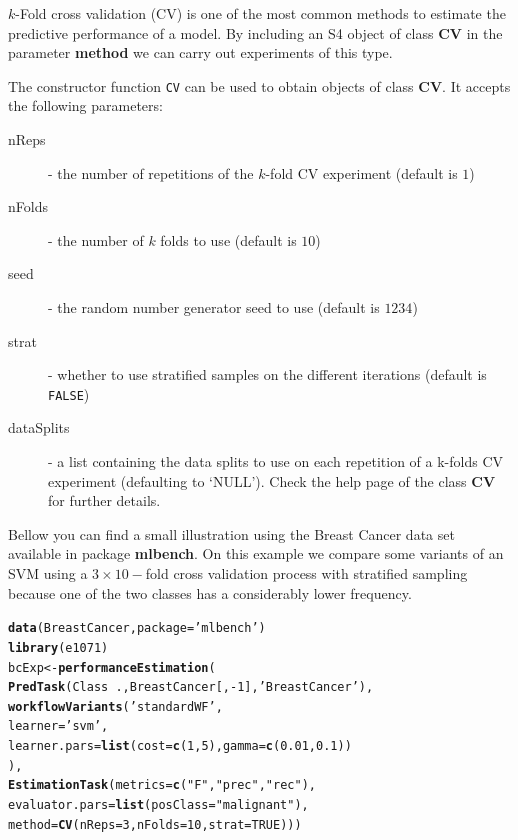 \documentclass[10pt,a4paper]{article}\usepackage[]{graphicx}\usepackage[]{color}
\makeatletter
\newcommand{\hlnum}[1]{\textcolor[rgb]{0.686,0.059,0.569}{#1}}%
\newcommand{\hlstr}[1]{\textcolor[rgb]{0.192,0.494,0.8}{#1}}%
\newcommand{\hlopt}[1]{\textcolor[rgb]{0,0,0}{#1}}%
\newcommand{\hlstd}[1]{\textcolor[rgb]{0.345,0.345,0.345}{#1}}%
\newcommand{\hlkwb}[1]{\textcolor[rgb]{0.69,0.353,0.396}{#1}}%
\newcommand{\hlkwc}[1]{\textcolor[rgb]{0.333,0.667,0.333}{#1}}%
\newcommand{\hlkwd}[1]{\textcolor[rgb]{0.737,0.353,0.396}{\textbf{#1}}}%
\newenvironment{kframe}{%
 \def\at@end@of@kframe{}%
 \ifinner\ifhmode%
  \def\at@end@of@kframe{\end{minipage}}%
  \begin{minipage}{\columnwidth}%
 \fi\fi%
 \def\FrameCommand##1{\hskip\@totalleftmargin \hskip-\fboxsep
 \colorbox{shadecolor}{##1}\hskip-\fboxsep
     \hskip-\linewidth \hskip-\@totalleftmargin \hskip\columnwidth}%
 \MakeFramed {\advance\hsize-\width
   \@totalleftmargin\z@ \linewidth\hsize
   \@setminipage}}%
 {\par\unskip\endMakeFramed%
 \at@end@of@kframe}
\newenvironment{knitrout}{}{} %
\makeatother
\begin{document}
$k$-Fold cross validation (CV) is one of the most common 
methods to estimate the predictive performance of a model. By
including an S4 object of class \textbf{CV} in the parameter \textbf{method} we can carry
out experiments of this type.

The constructor function \texttt{CV} can be used to obtain objects
of class \textbf{CV}. It accepts the following parameters:

\begin{description}
\item[nReps] - the number of repetitions of the $k$-fold CV experiment (default is $1$)
\item[nFolds] - the number of $k$ folds to use (default is $10$)
\item[seed] - the random number generator seed to use (default is $1234$)
\item[strat] - whether to use stratified samples on the different iterations (default is \texttt{FALSE})
\item[dataSplits] - a list containing the data splits to
          use on each repetition of a k-folds CV experiment (defaulting
          to ‘NULL’). Check the help page of the
  class \textbf{CV} for further details. 
\end{description}

Bellow you can find a small illustration using the Breast Cancer data
set available in package \textbf{mlbench}. On this example we compare
some variants of an SVM using a $3\times 10-$fold cross validation
process with stratified sampling because one of the two classes has a
considerably lower frequency.

\begin{knitrout}\footnotesize
{}\color{fgcolor}\begin{kframe}
\begin{alltt}
\hlkwd{data}\hlstd{(BreastCancer,}\hlkwc{package}\hlstd{=}\hlstr{'mlbench'}\hlstd{)}
\hlkwd{library}\hlstd{(e1071)}
\hlstd{bcExp} \hlkwb{<-} \hlkwd{performanceEstimation}\hlstd{(}
  \hlkwd{PredTask}\hlstd{(Class} \hlopt{~} \hlstd{.,BreastCancer[,}\hlopt{-}\hlnum{1}\hlstd{],}\hlstr{'BreastCancer'}\hlstd{),}
  \hlkwd{workflowVariants}\hlstd{(}\hlstr{'standardWF'}\hlstd{,}
           \hlkwc{learner}\hlstd{=}\hlstr{'svm'}\hlstd{,}
           \hlkwc{learner.pars}\hlstd{=}\hlkwd{list}\hlstd{(}\hlkwc{cost}\hlstd{=}\hlkwd{c}\hlstd{(}\hlnum{1}\hlstd{,}\hlnum{5}\hlstd{),}\hlkwc{gamma}\hlstd{=}\hlkwd{c}\hlstd{(}\hlnum{0.01}\hlstd{,}\hlnum{0.1}\hlstd{))}
          \hlstd{),}
  \hlkwd{EstimationTask}\hlstd{(}\hlkwc{metrics}\hlstd{=}\hlkwd{c}\hlstd{(}\hlstr{"F"}\hlstd{,}\hlstr{"prec"}\hlstd{,}\hlstr{"rec"}\hlstd{),}
                 \hlkwc{evaluator.pars}\hlstd{=}\hlkwd{list}\hlstd{(}\hlkwc{posClass}\hlstd{=}\hlstr{"malignant"}\hlstd{),}
                 \hlkwc{method}\hlstd{=}\hlkwd{CV}\hlstd{(}\hlkwc{nReps}\hlstd{=}\hlnum{3}\hlstd{,}\hlkwc{nFolds}\hlstd{=}\hlnum{10}\hlstd{,}\hlkwc{strat}\hlstd{=}\hlnum{TRUE}\hlstd{)))}
\end{alltt}
\end{kframe}
\end{knitrout}
\end{document}
